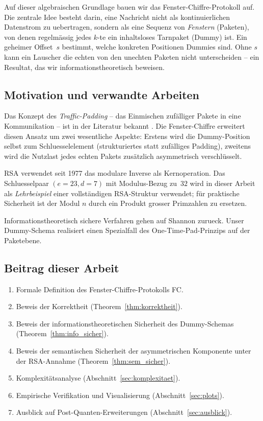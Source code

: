﻿\documentclass[12pt, a4paper]{article}
\theoremstyle{plain}
\theoremstyle{definition}
\theoremstyle{remark}
\begin{document}
Auf dieser algebraischen Grundlage bauen wir das Fenster-Chiffre-Protokoll auf.
Die zentrale Idee besteht darin, eine Nachricht nicht als kontinuierlichen
Datenstrom zu uebertragen, sondern als eine Sequenz von \emph{Fenstern}
(Paketen), von denen regelm\"assig jedes $k$-te ein inhaltsloses
Tarnpaket (Dummy) ist. Ein geheimer Offset~$s$ bestimmt, welche konkreten
Positionen Dummies sind. Ohne $s$ kann ein Lauscher die echten von den
unechten Paketen nicht unterscheiden -- ein Resultat, das wir
informationstheoretisch beweisen.

\subsection{Motivation und verwandte Arbeiten}

Das Konzept des \emph{Traffic-Padding} -- das Einmischen zuf\"alliger
Pakete in eine Kommunikation -- ist in der Literatur bekannt
\cite{raymond2000traffic}. Die Fenster-Chiffre erweitert diesen Ansatz
um zwei wesentliche Aspekte: Erstens wird die Dummy-Position selbst zum
Schluesselelement (strukturiertes statt zuf\"alliges Padding), zweitens
wird die Nutzlast jedes echten Pakets zus\"atzlich asymmetrisch
verschl\"usselt.

RSA \cite{rivest1978method} verwendet seit 1977 das modulare Inverse als
Kernoperation. Das Schluesselpaar $(e=23, d=7)$ mit Modulus-Bezug zu~$32$
wird in dieser Arbeit als \emph{Lehrbeispiel} einer vollst\"andigen
RSA-Struktur verwendet; f\"ur praktische Sicherheit ist der Modul $n$ durch
ein Produkt grosser Primzahlen zu ersetzen.

Informationstheoretisch sichere Verfahren gehen auf Shannon \cite{shannon1949communication}
zurueck. Unser Dummy-Schema realisiert einen Spezialfall des
One-Time-Pad-Prinzips auf der Paketebene.

\subsection{Beitrag dieser Arbeit}

\begin{enumerate}[label=(\roman*)]
  \item Formale Definition des Fenster-Chiffre-Protokolls FC.
  \item Beweis der Korrektheit (Theorem~\ref{thm:korrektheit}).
  \item Beweis der informationstheoretischen Sicherheit des Dummy-Schemas
        (Theorem~\ref{thm:info_sicher}).
  \item Beweis der semantischen Sicherheit der asymmetrischen Komponente
        unter der RSA-Annahme (Theorem~\ref{thm:sem_sicher}).
  \item Komplexit\"atsanalyse (Abschnitt~\ref{sec:komplexitaet}).
  \item Empirische Verifikation und Visualisierung (Abschnitt~\ref{sec:plots}).
  \item Ausblick auf Post-Quanten-Erweiterungen (Abschnitt~\ref{sec:ausblick}).
\end{enumerate}
\end{document}
